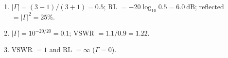 \begin{enumerate}[leftmargin=1.6em,itemsep=2pt]
\item $|\Gamma| = (3-1)/(3+1) = 0.5$; RL $= -20\log_{10}0.5 = 6.0\ \text{dB}$; reflected $= |\Gamma|^2 = 25\%$.
\item $|\Gamma| = 10^{-20/20} = 0.1$; VSWR $= 1.1/0.9 = 1.22$.
\item VSWR $= 1$ and RL $= \infty$ ($\Gamma = 0$).
\end{enumerate}
